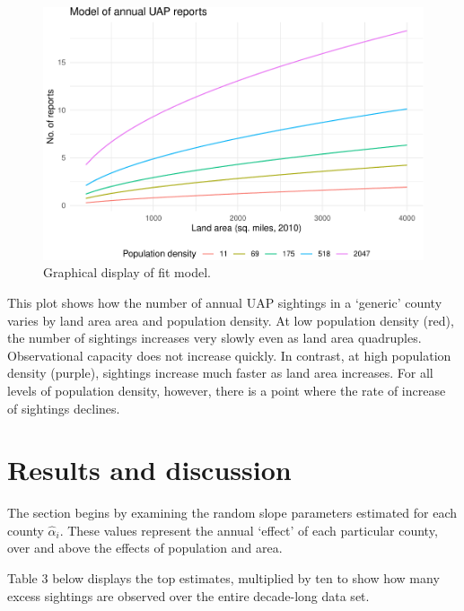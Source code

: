 \documentclass[]{elsarticle} %
\begin{document}
\begin{figure}

{\centering \includegraphics[width=1\linewidth]{lmm_paper_files/figure-latex/unnamed-chunk-8-1} 

}

\caption{Graphical display of fit model.}\label{fig:unnamed-chunk-8}
\end{figure}

This plot shows how the number of annual UAP sightings in a `generic'
county varies by land area area and population density. At low
population density (red), the number of sightings increases very slowly
even as land area quadruples. Observational capacity does not increase
quickly. In contrast, at high population density (purple), sightings
increase much faster as land area increases. For all levels of
population density, however, there is a point where the rate of increase
of sightings declines.

\hypertarget{results-and-discussion}{%
\section{Results and discussion}\label{results-and-discussion}}

The section begins by examining the random slope parameters estimated
for each county \(\hat{\alpha}_i\). These values represent the annual
`effect' of each particular county, over and above the effects of
population and area.

Table 3 below displays the top estimates, multiplied by ten to show how
many excess sightings are observed over the entire decade-long data set.
\end{document}
